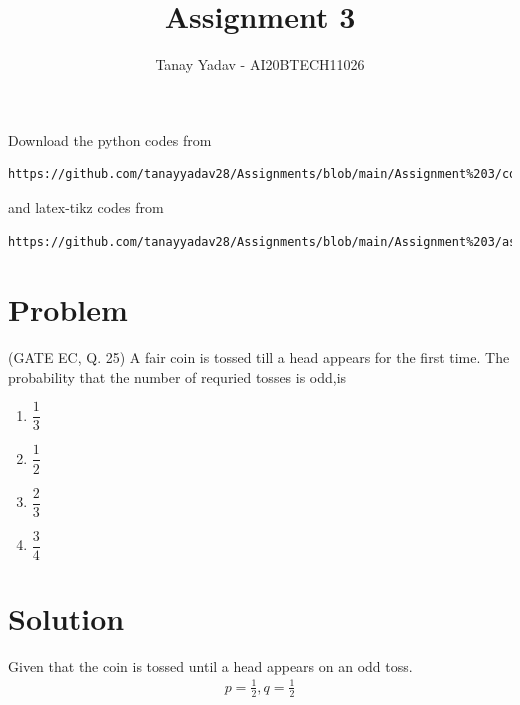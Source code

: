 \documentclass[journal,12pt,twocolumn]{IEEEtran}
\begin{document}
     \def\rightbox#1{\makebox[0in][r]{#1}}
     \def\centbox#1{\makebox[0in]{#1}}
     \def\topbox#1{\raisebox{-\baselineskip}[0in][0in]{#1}}
     \def\midbox#1{\raisebox{-0.5\baselineskip}[0in][0in]{#1}}
\vspace{3cm}
\title{Assignment 3}
\author{Tanay Yadav - AI20BTECH11026}
\maketitle
\newpage
\bigskip
\renewcommand{\thefigure}{\theenumi}
\renewcommand{\thetable}{\theenumi}
Download the python codes from 
\begin{lstlisting}
https://github.com/tanayyadav28/Assignments/blob/main/Assignment%203/code/assignment3.py
\end{lstlisting}
%
and latex-tikz codes from 
%
\begin{lstlisting}
https://github.com/tanayyadav28/Assignments/blob/main/Assignment%203/assignment3.tex
\end{lstlisting}
\section{Problem}
(GATE EC, Q. 25) A fair coin is tossed till a head appears for the first time. The probability that the number of requried tosses is odd,is\\
\begin{enumerate}
    \item $\dfrac{1}{3}$\\
    \item $\dfrac{1}{2}$\\
    \item $\dfrac{2}{3}$\\
    \item $\dfrac{3}{4}$
\end{enumerate}
\section{Solution}
Given that the coin is tossed until a head appears on an odd toss.\\
\begin{align}
    p = \frac{1}{2}, q = \frac{1}{2}
\end{align}
\end{document}
